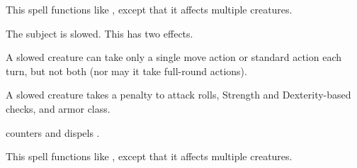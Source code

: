 \begin{spelleffect}
  This spell functions like , except that it affects multiple creatures.
\end{spelleffect}

\spellrng{\rngclose}
\spelldur{\durshort}
\begin{spelleffect}
  The subject is slowed. This has two effects.
  \par A slowed creature can take only a single move action or standard action each turn, but not both (nor may it take full-round actions).
  \par A slowed creature takes a  penalty to attack rolls, Strength and Dexterity-based checks, and armor class.
\end{spelleffect}
\begin{spellnotes}
   counters and dispels .
\end{spellnotes}

\spellrng{\rngmed}
\begin{spelleffect}
  This spell functions like , except that it affects multiple creatures.
\end{spelleffect}

